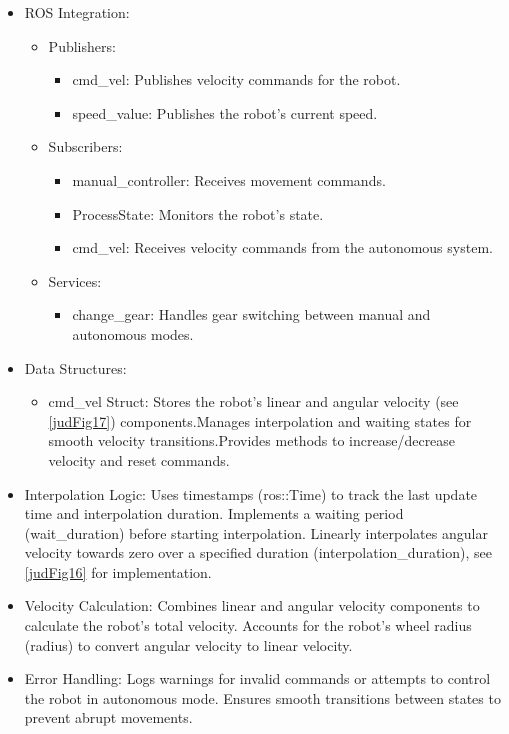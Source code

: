 \documentclass[a4paper,12pt]{extreport}
\begin{document}
\begin{itemize}
\item
  ROS Integration:

  \begin{itemize}
  \item
    Publishers:

    \begin{itemize}
    \item
      cmd\_vel: Publishes velocity commands for the robot.
    \item
      speed\_value: Publishes the robot's current speed.
    \end{itemize}
  \item
    Subscribers:

    \begin{itemize}
    \item
      manual\_controller: Receives movement commands.
    \item
      ProcessState: Monitors the robot's state.
    \item
      cmd\_vel: Receives velocity commands from the autonomous system.
    \end{itemize}
  \item
    Services:

    \begin{itemize}
    \item
      change\_gear: Handles gear switching between manual and autonomous
      modes.
    \end{itemize}
  \end{itemize}
\item
  Data Structures:

  \begin{itemize}
  \item
    cmd\_vel Struct: Stores the robot's linear and angular velocity (see
    \cref{judFig17}) components.Manages interpolation and waiting states for
    smooth velocity transitions.Provides methods to increase/decrease
    velocity and reset commands.
  \end{itemize}
\item
  Interpolation Logic: Uses timestamps (ros::Time) to track the last
  update time and interpolation duration. Implements a waiting period
  (wait\_duration) before starting interpolation. Linearly interpolates
  angular velocity towards zero over a specified duration
  (interpolation\_duration), see \cref{judFig16} for implementation.
\item
  Velocity Calculation: Combines linear and angular velocity components
  to calculate the robot's total velocity. Accounts for the robot's
  wheel radius (radius) to convert angular velocity to linear velocity.
\item
  Error Handling: Logs warnings for invalid commands or attempts to
  control the robot in autonomous mode. Ensures smooth transitions
  between states to prevent abrupt movements.
\end{itemize}
\end{document}
